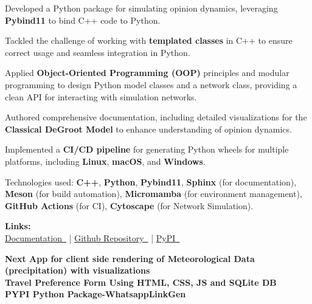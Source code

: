 \documentclass[]{resume}
\begin{document}
\begin{minipage}[t]{0.60\textwidth}
\location{}
\begin{tightemize}
\item Developed a Python package for simulating opinion dynamics, leveraging \textbf{Pybind11} to bind C++ code to Python.
\item Tackled the challenge of working with \textbf{templated classes} in C++ to ensure correct usage and seamless integration in Python.
\item Applied \textbf{Object-Oriented Programming (OOP)} principles and modular programming to design Python model classes and a network class, providing a clean API for interacting with simulation networks.
\item Authored comprehensive documentation, including detailed visualizations for the \textbf{Classical DeGroot Model} to enhance understanding of opinion dynamics.
\item Implemented a \textbf{CI/CD pipeline} for generating Python wheels for multiple platforms, including \textbf{Linux}, \textbf{macOS}, and \textbf{Windows}.
\item Technologies used: \textbf{C++}, \textbf{Python}, \textbf{Pybind11}, \textbf{Sphinx} (for documentation), \textbf{Meson} (for build automation), \textbf{Micromamba} (for environment management), \textbf{GitHub Actions} (for CI), \textbf{Cytoscape} (for Network Simulation).
\item \textbf{Links: } \\
\href{https://seldon-code.github.io/pyseldonlib/}{Documentation\faLink\ } | 
\href{https://github.com/seldon-code/pyseldonlib}{Github Repository\faLink\ } | 
\href{https://pypi.org/project/pyseldonlib/}{PyPI\faLink\ }
\end{tightemize}
\sectionsep

\small{
\textbf{Next App for client side rendering of Meteorological Data (precipitation) with visualizations\href{https://github.com/User-DK/Demo-Met-Data-vis}{\faLink}}  \\
\vspace{0.4em}
\textbf{Travel Preference Form Using HTML, CSS, JS and SQLite DB\href{https://github.com/User-DK/Travel-preference-form}{\faLink}} \\
\vspace{0.4em}
\textbf{PYPI Python Package-WhatsappLinkGen\href{https://pypi.org/project/whatsapplinkgen/}{\faLink}}}
\sectionsep


\end{minipage}
\end{document}

